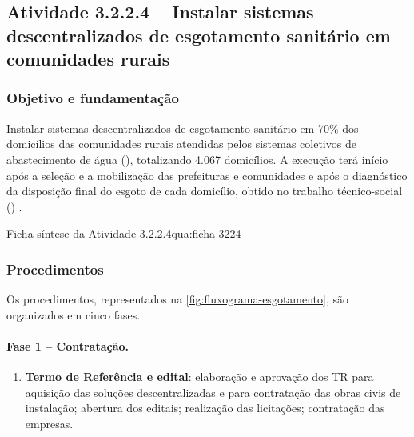\subsection{Atividade 3.2.2.4 -- Instalar sistemas descentralizados de esgotamento sanitário em comunidades rurais}
\label{subsec:esgotamento-comunidades}

\subsubsection{Objetivo e fundamentação}

Instalar sistemas descentralizados de esgotamento sanitário em 70\% dos
domicílios das comunidades rurais atendidas pelos sistemas coletivos de
abastecimento de água (), totalizando 4.067 domicílios.
A execução terá início após a seleção e a mobilização das prefeituras e
comunidades e após o diagnóstico da disposição final do esgoto de cada
domicílio, obtido no trabalho técnico-social ()
\cite{mop2026}.

\begin{fichaatividade}{Ficha-síntese da Atividade 3.2.2.4}{qua:ficha-3224}
\end{fichaatividade}

\subsubsection{Procedimentos}
\label{subsubsec:proc-esgotamento}

Os procedimentos, representados na \autoref{fig:fluxograma-esgotamento}, são
organizados em cinco fases.

\paragraph{Fase 1 -- Contratação.}
\begin{enumerate}[label=\alph*)]
  \item \textbf{Termo de Referência e edital}: elaboração e aprovação dos TR
        para aquisição das soluções descentralizadas e para contratação das
        obras civis de instalação; abertura dos editais; realização das
        licitações; contratação das empresas.
\end{enumerate}

